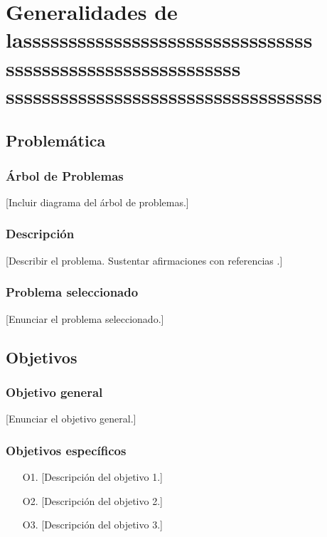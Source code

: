 
\chapter[Generalidades]{Generalidades de lassssssssssssssssssssssssssssssss
ssssssssssssssssssssssssss
sssssssssssssssssssssssssssssssssss}
\label{ch:generalities}

\section{Problemática}

\subsection{Árbol de Problemas}
[Incluir diagrama del árbol de problemas.]
\lipsum

\subsection{Descripción}
[Describir el problema. Sustentar afirmaciones con referencias \citex.]

\subsection{Problema seleccionado}
[Enunciar el problema seleccionado.]

\section{Objetivos}

\subsection{Objetivo general}
[Enunciar el objetivo general.]

\subsection{Objetivos específicos}
\begin{enumerate}
  \item[O1.] [Descripción del objetivo 1.]
  \item[O2.] [Descripción del objetivo 2.]
  \item[O3.] [Descripción del objetivo 3.]
\end{enumerate}

